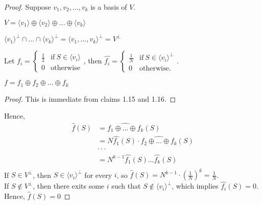 \begin{proof}
Suppose $v_1, v_2,..., v_k $ is a basis of $V$.

\begin{claim}
$V = \langle v_1 \rangle \oplus \langle v_2 \rangle 
	 \oplus ... \oplus \langle v_k \rangle $
\end{claim}

\begin{claim}
${\langle v_1 \rangle}^\perp \cap ... \cap {\langle v_k \rangle}^\perp
= {\langle v_1, ..., v_k \rangle}^\perp = V^\perp$
\end{claim}

\noindent Let $f_i = \begin{cases}
	\frac{1}{2} & \text{if} \ S \in \langle v_i \rangle \\
	0             & \text{otherwise}
\end{cases}$, 
then $\hat{f_i} = \begin{cases}
	\frac{1}{N} & \text{if} \ S \in {\langle v_i \rangle}^ \perp \\
	0             & \text{otherwise}.
\end{cases}$. 

\begin{claim}
$f = f_1 \oplus f_2 \oplus ... \oplus f_k$
\end{claim}

\begin{proof}
This is immediate from claims 1.15 and 1.16.
\end{proof}

\noindent Hence,
\begin{align*}
\hat{f}(S)
         & = \widehat{f_1 \oplus ... \oplus f_k}(S) \\
         & = N \hat{f_1}(S) \cdot \widehat{f_2 \oplus ... \oplus f_k}(S)   \\
         & \cdot \cdot \cdot \\
         & = N^{k-1} \hat{f_1}(S) ... \hat{f_k}(S) \\
\end{align*}
If $S \in V^\perp$, then $S \in {\langle v_i \rangle}^\perp$ for every $i$, so $\hat{f}(S) = N^{k-1} \cdot (\frac{1}{N})^k = \frac{1}{N}$. \\
If $S \not\in V^\perp$, then there exits some $i$ such that $S \not\in {\langle v_i \rangle}^\perp$, which implies $\hat{f_i}(S) = 0$. Hence, $\hat{f}(S) = 0$
\end{proof}

